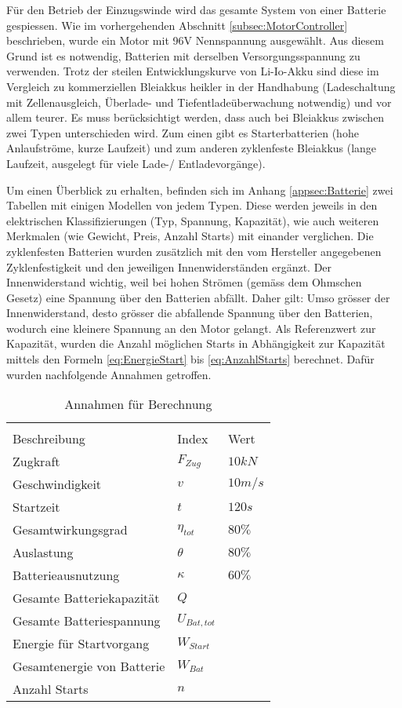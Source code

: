 Für den Betrieb der Einzugswinde wird das gesamte System von einer Batterie gespiessen. Wie im vorhergehenden Abschnitt \ref{subsec:MotorController} beschrieben, wurde ein Motor mit 96V Nennspannung ausgewählt. Aus diesem Grund ist es notwendig, Batterien mit derselben Versorgungsspannung zu verwenden. Trotz der steilen Entwicklungskurve von Li-Io-Akku sind diese im Vergleich zu kommerziellen Bleiakkus heikler in der Handhabung (Ladeschaltung mit Zellenausgleich, Überlade- und Tiefentladeüberwachung notwendig) und vor allem teurer. Es muss berücksichtigt werden, dass auch bei Bleiakkus zwischen zwei Typen unterschieden wird. Zum einen gibt es Starterbatterien (hohe Anlaufströme, kurze Laufzeit) und zum anderen zyklenfeste Bleiakkus (lange Laufzeit, ausgelegt für viele Lade-/ Entladevorgänge).

Um einen Überblick zu erhalten, befinden sich im Anhang \ref{appsec:Batterie} zwei Tabellen mit einigen Modellen von jedem Typen. Diese werden jeweils in den elektrischen Klassifizierungen (Typ, Spannung, Kapazität), wie auch weiteren Merkmalen (wie Gewicht, Preis, Anzahl Starts) mit einander verglichen. Die zyklenfesten Batterien wurden zusätzlich mit den vom Hersteller angegebenen Zyklenfestigkeit und den jeweiligen Innenwiderständen ergänzt. Der Innenwiderstand wichtig, weil bei hohen Strömen (gemäss dem Ohmschen Gesetz) eine Spannung über den Batterien abfällt. Daher gilt: Umso grösser der Innenwiderstand, desto grösser die abfallende Spannung über den Batterien, wodurch eine kleinere Spannung an den Motor gelangt.
Als Referenzwert zur Kapazität, wurden die Anzahl möglichen Starts in Abhängigkeit zur Kapazität mittels den Formeln \ref{eq:EnergieStart} bis \ref{eq:AnzahlStarts} berechnet. Dafür wurden nachfolgende Annahmen getroffen. 

\begin{table}[H]
	\centering
	\begin{tabular}{C{5cm} C{2.5cm} C{2cm}}
		\\
	{Beschreibung} & {Index} & {Wert} \\ \hline
	Zugkraft    &   $ F_{Zug} $    & $10 kN$   \\
	Geschwindigkeit    &   $ v $    & $10 m/s$   \\
	Startzeit    &   $ t $   & $120 s$   \\
	Gesamtwirkungsgrad    &  $ \eta_{tot} $    & $80\%$   \\
	Auslastung    &  $ \theta $   & $80\%$  \\
	Batterieausnutzung    &  $ \kappa $    & $60\%$   \\
	Gesamte Batteriekapazität   &   $ Q $    &   \\
	Gesamte Batteriespannung    &   $ U_{Bat,tot} $    &   \\
	Energie für Startvorgang    &   $ W_{Start} $    &   \\
	Gesamtenergie von Batterie   &   $ W_{Bat} $    &   \\
	Anzahl Starts    &   $ n $    &    \\	
	\end{tabular}
	\caption{Annahmen für Berechnung}
	\label{tab:BerechnungAnzahlStart}
\end{table}

